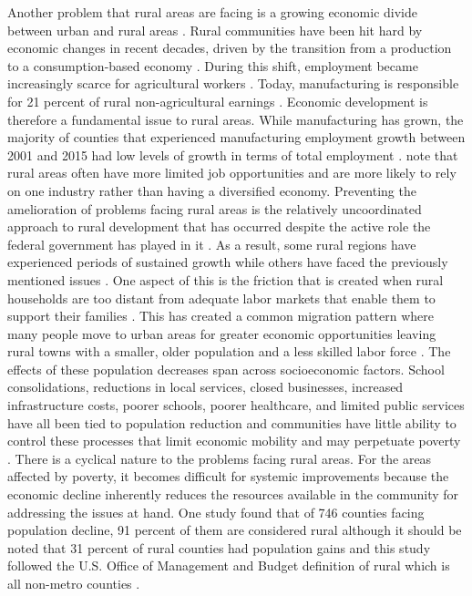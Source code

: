  

Another problem that rural areas are facing is a growing economic divide between urban and rural areas \citep{bjerke_mover_2019}. Rural communities have been hit hard by economic changes in recent decades, driven by the transition from a production to a consumption-based economy \citep{pendall_future_2016}. During this shift, employment became increasingly scarce for agricultural workers \citep{kropczynski_insights_2012}. Today, manufacturing is responsible for 21 percent of rural non-agricultural earnings \citep{low_rural_2017}. Economic development is therefore a fundamental issue to rural areas. While manufacturing has grown, the majority of counties that experienced manufacturing employment growth between 2001 and 2015 had low levels of growth in terms of total employment \citep{low_rural_2017}. \citet{blank_poverty_2005} note that rural areas often have more limited job opportunities and are more likely to rely on one industry rather than having a diversified economy. Preventing the amelioration of problems facing rural areas is the relatively uncoordinated approach to rural development that has occurred despite the active role the federal government has played in it \citep{wilson_rural_2016}. As a result, some rural regions have experienced periods of sustained growth while others have faced the previously mentioned issues \citep{johnson_rural_2012}. One aspect of this is the friction that is created when rural households are too distant from adequate labor markets that enable them to support their families \citep{sparks_poverty_2013}. This has created a common migration pattern where many people move to urban areas for greater economic opportunities leaving rural towns with a smaller, older population and a less skilled labor force \citep{bjerke_mover_2019}. The effects of these population decreases span across socioeconomic factors. School consolidations, reductions in local services, closed businesses, increased infrastructure costs, poorer schools, poorer healthcare, and limited public services have all been tied to population reduction and communities have little ability to control these processes that limit economic mobility and may perpetuate poverty \citep{martinez_rural_2021}. There is a cyclical nature to the problems facing rural areas. For the areas affected by poverty, it becomes difficult for systemic improvements because the economic decline inherently reduces the resources available in the community for addressing the issues at hand. One study found that of 746 counties facing population decline, 91 percent of them are considered rural although it should be noted that 31 percent of rural counties had population gains and this study followed the U.S. Office of Management and Budget definition of rural which is all non-metro counties \citep{johnson_rural_2019}. 

